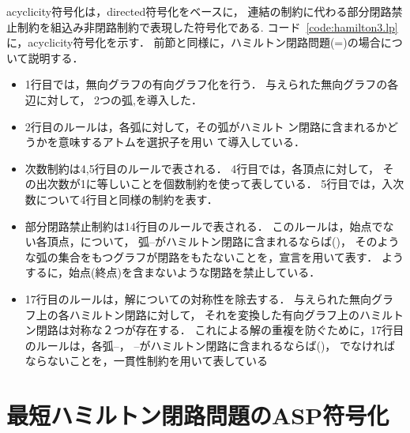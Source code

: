 \textsf{acyclicity}符号化は，\textsf{directed}符号化をベースに，
連結の制約に代わる部分閉路禁止制約を組込み非閉路制約で表現した符号化である.
コード~\ref{code:hamilton3.lp}に，\textsf{acyclicity}符号化を示す．
前節と同様に，ハミルトン閉路問題(=)の場合について説明する．

\begin{itemize}
\item 1行目では，無向グラフの有向グラフ化を行う．
  与えられた無向グラフの各辺に対して，
  2つの弧,を導入した．
\item 2行目のルールは，各弧に対して，その弧がハミルト
  ン閉路に含まれるかどうかを意味するアトムを選択子を用い
  て導入している．
\item 次数制約は4,5行目のルールで表される．
  4行目では，各頂点に対して，
  その出次数が1に等しいことを個数制約を使って表している．
  5行目では，入次数について4行目と同様の制約を表す．
\item 部分閉路禁止制約は14行目のルールで表される．
  このルールは，始点でない各頂点，について，
  弧--がハミルトン閉路に含まれるならば()，
  そのような弧の集合をもつグラフが閉路をもたないことを，宣言を用いて表す．
  ようするに，始点(終点)を含まないような閉路を禁止している．
\item 17行目のルールは，解についての対称性を除去する．
  与えられた無向グラフ上の各ハミルトン閉路に対して，
  それを変換した有向グラフ上のハミルトン閉路は対称な２つが存在する．
  これによる解の重複を防ぐために，17行目のルールは，各弧--，
  --がハミルトン閉路に含まれるならば()，
  でなければならないことを，一貫性制約を用いて表している
\end{itemize}

\section{最短ハミルトン閉路問題のASP符号化}\label{minexpl}



